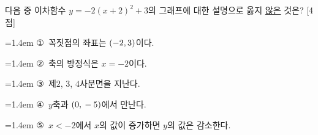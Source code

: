 다음 중 이차함수 $y=-2(x+2)^2+3$의 그래프에 대한 설명으로 옳지 \underline{않은} 것은? \mbox{[4점]}
\par\medskip\par\noindent\hangindent=1.4em {\small ①}\ 꼭짓점의 좌표는 $(-2{,}\mkern3mu 3)$이다.\par\noindent\hangindent=1.4em {\small ②}\ 축의 방정식은 $x=-2$이다.\par\noindent\hangindent=1.4em {\small ③}\ 제$2$, $3$, $4$사분면을 지난다.\par\noindent\hangindent=1.4em {\small ④}\ $y$축과 $(0{,}\mkern3mu -5)$에서 만난다.\par\noindent\hangindent=1.4em {\small ⑤}\ $x<-2$에서 $x$의 값이 증가하면 $y$의 값은 감소한다.\par\medskip

